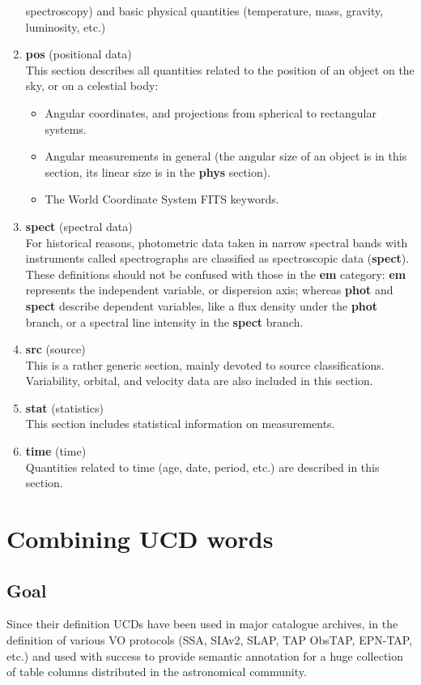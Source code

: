 \documentclass[11pt,a4paper]{ivoa}
\begin{document}
\begin{enumerate}
spectroscopy) and basic physical quantities (temperature, mass, gravity, luminosity, etc.)
\item {\bf pos} (positional data)\\ This section describes all quantities related to the position of 
an object on the sky, or on a celestial body:
\begin{itemize}
\item Angular coordinates, and projections from spherical to rectangular systems.
\item Angular measurements in general (the angular size of an object is in this section, its linear 
size is in the {\bf phys} section).
\item The World Coordinate System FITS keywords.
\end{itemize}
\item {\bf spect} (spectral data)\\ For historical reasons, photometric data taken in narrow spectral 
bands with instruments called spectrographs are classified as spectroscopic data ({\bf spect}). These 
definitions should not be confused with those in the {\bf em} category: {\bf em} represents the independent 
variable, or dispersion axis; whereas {\bf phot} and {\bf spect} describe dependent variables, like a 
flux density under the {\bf phot} branch, or a spectral line intensity in the {\bf spect} branch.  
\item {\bf src} (source)\\ This is a rather generic section, mainly devoted to source classifications.
Variability, orbital, and velocity data are also included in this section.
\item {\bf stat} (statistics)\\ This section includes statistical information on measurements.
\item {\bf time} (time)\\ Quantities related to time (age, date, period, etc.) are described in this 
section.
\end{enumerate}

\section{Combining UCD words}
\subsection{Goal}
Since their definition UCDs have been used in major catalogue archives, in the definition of various
VO protocols (SSA, SIAv2, SLAP, TAP ObsTAP, EPN-TAP, etc.) and used with success to provide semantic
annotation for a huge collection of table columns distributed in the astronomical community.
\end{document}
